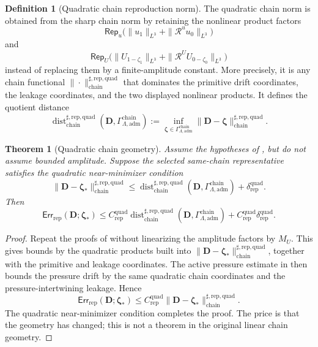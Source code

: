\documentclass[11pt]{article}
\numberwithin{equation}{section}
\newtheorem{theorem}{Theorem}[section]
\theoremstyle{definition}
\newtheorem{definition}[definition]{Definition}
\theoremstyle{remark}
\newcommand{\adm}{\mathrm{adm}}
\newcommand{\rep}{\mathrm{rep}}
\newcommand{\chain}{\mathrm{chain}}
\newcommand{\quadg}{\mathrm{quad}}
\newcommand{\Err}{\mathsf{Err}}
\newcommand{\Rep}{\mathsf{Rep}}
\newcommand{\Dist}{\operatorname{dist}}
\newcommand{\calR}{\mathcal R}
\newcommand{\bD}{\mathbf D}
\newcommand{\bzeta}{\boldsymbol\zeta}
\newcommand{\Gchain}{\Gamma_{\Lambda,\adm}^{\chain}}
\begin{document}
\begin{definition}[Quadratic chain reproduction norm]
\label{rep:def:quadratic-chain-reproduction-norm}
The quadratic chain norm is obtained from the sharp chain norm by retaining the
nonlinear product factors
\[
    \Rep_u
    \bigl(
        \|u_1\|_{L^3}
        +
        \|\calR^u u_0\|_{L^3}
    \bigr)
\]
and
\[
    \Rep_U
    \bigl(
        \|U_{1-\zeta_1}\|_{L^3}
        +
        \|\calR^U U_{0-\zeta_0}\|_{L^3}
    \bigr)
\]
instead of replacing them by a finite-amplitude constant.  More precisely, it
is any chain functional \(\|\cdot\|_{\chain}^{\sharp,\rep,\quadg}\) that
dominates the primitive drift coordinates, the leakage coordinates, and the
two displayed nonlinear products.  It defines the quotient distance
\[
    \Dist_{\chain}^{\sharp,\rep,\quadg}(\bD,\Gchain)
    :=
    \inf_{\bzeta\in\Gchain}
    \|\bD-\bzeta\|_{\chain}^{\sharp,\rep,\quadg}.
\]
\end{definition}

\begin{theorem}[Quadratic chain geometry]
\label{rep:thm:quadratic-chain-geometry}
Assume the hypotheses of
,
but do not assume bounded amplitude.  Suppose the selected same-chain
representative satisfies the quadratic near-minimizer condition
\[
    \|\bD-\bzeta_*\|_{\chain}^{\sharp,\rep,\quadg}
    \le
    \Dist_{\chain}^{\sharp,\rep,\quadg}(\bD,\Gchain)
    +
    \delta_{\rep}^{\quadg}.
\]
Then
\[
    \Err_{\rep}(\bD;\bzeta_*)
    \le
    C_{\rep}^{\quadg}
    \Dist_{\chain}^{\sharp,\rep,\quadg}(\bD,\Gchain)
    +
    C_{\rep}^{\quadg}\delta_{\rep}^{\quadg}.
\]
\end{theorem}

\begin{proof}
Repeat the proofs of
 without
linearizing the amplitude factors by \(M_U\).  This gives bounds by the
quadratic products built into
\(\|\bD-\bzeta_*\|_{\chain}^{\sharp,\rep,\quadg}\), together with the
primitive and leakage coordinates.  The active pressure estimate in
 then bounds the pressure drift by the
same quadratic chain coordinates and the pressure-intertwining leakage.  Hence
\[
    \Err_{\rep}(\bD;\bzeta_*)
    \le
    C_{\rep}^{\quadg}
    \|\bD-\bzeta_*\|_{\chain}^{\sharp,\rep,\quadg}.
\]
The quadratic near-minimizer condition completes the proof.  The price is that
the geometry has changed; this is not a theorem in the original linear chain
geometry.
\end{proof}
\end{document}
